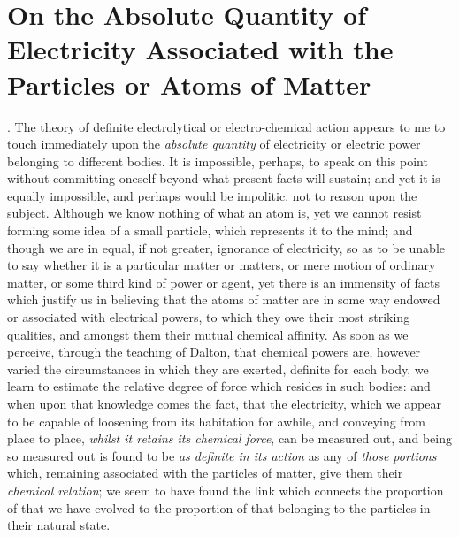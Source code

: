 \chapter{On the Absolute Quantity of Electricity Associated with the Particles or
Atoms of Matter}

\chapterprecis{}




. The theory of definite electrolytical or electro-chemical action
appears to me to touch immediately upon the \emph{absolute quantity} of
electricity or electric power belonging to different bodies. It is
impossible, perhaps, to speak on this point without committing oneself
beyond what present facts will sustain; and yet it is equally
impossible, and perhaps would be impolitic, not to reason upon the
subject. Although we know nothing of what an atom is, yet we cannot
resist forming some idea of a small particle, which represents it to the
mind; and though we are in equal, if not greater, ignorance of
electricity, so as to be unable to say whether it is a particular matter
or matters, or mere motion of ordinary matter, or some third kind of
power or agent, yet there is an immensity of facts which justify us in
believing that the atoms of matter are in some way endowed or associated
with electrical powers, to which they owe their most striking qualities,
and amongst them their mutual chemical affinity. As soon as we perceive,
through the teaching of Dalton, that chemical powers are, however varied
the circumstances in which they are exerted, definite for each body, we
learn to estimate the relative degree of force which resides in such
bodies: and when upon that knowledge comes the fact, that the
electricity, which we appear to be capable of loosening from its
habitation for awhile, and conveying from place to place, \emph{whilst
it retains its chemical force}, can be measured out, and being so
measured out is found to be \emph{as definite in its action} as any of
\emph{those portions} which, remaining associated with the particles of
matter, give them their \emph{chemical relation}; we seem to have found
the link which connects the proportion of that we have evolved to the
proportion of that belonging to the particles in their natural state.

